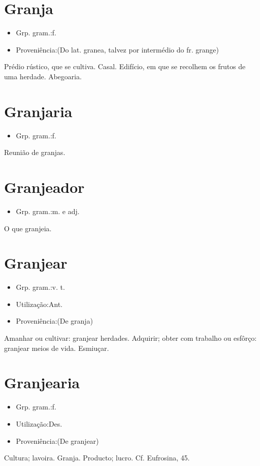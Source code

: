 \section{Granja}
\begin{itemize}
\item {Grp. gram.:f.}
\end{itemize}
\begin{itemize}
\item {Proveniência:(Do lat. \textunderscore granea\textunderscore , talvez por intermédio do fr. \textunderscore grange\textunderscore )}
\end{itemize}
Prédio rústico, que se cultiva.
Casal.
Edifício, em que se recolhem os frutos de uma herdade.
Abegoaria.
\section{Granjaria}
\begin{itemize}
\item {Grp. gram.:f.}
\end{itemize}
Reunião de granjas.
\section{Granjeador}
\begin{itemize}
\item {Grp. gram.:m.  e  adj.}
\end{itemize}
O que granjeia.
\section{Granjear}
\begin{itemize}
\item {Grp. gram.:v. t.}
\end{itemize}
\begin{itemize}
\item {Utilização:Ant.}
\end{itemize}
\begin{itemize}
\item {Proveniência:(De \textunderscore granja\textunderscore )}
\end{itemize}
Amanhar ou cultivar: \textunderscore granjear herdades\textunderscore .
Adquirir; obter com trabalho ou esfôrço: \textunderscore granjear meios de vida\textunderscore .
Esmiuçar.
\section{Granjearia}
\begin{itemize}
\item {Grp. gram.:f.}
\end{itemize}
\begin{itemize}
\item {Utilização:Des.}
\end{itemize}
\begin{itemize}
\item {Proveniência:(De \textunderscore granjear\textunderscore )}
\end{itemize}
Cultura; lavoira.
Granja.
Producto; lucro. Cf. \textunderscore Eufrosina\textunderscore , 45.
